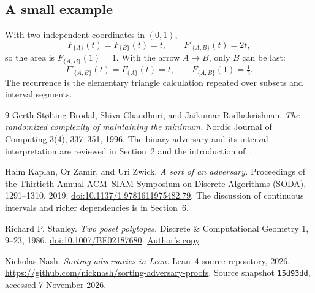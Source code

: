 \subsection{A small example}

With two independent coordinates in \((0,1)\),
\[
F_{\{A\}}(t)=F_{\{B\}}(t)=t,\qquad
F'_{\{A,B\}}(t)=2t,
\]
so the area is \(F_{\{A,B\}}(1)=1\). With the arrow \(A\to B\), only \(B\) can be last:
\[
F'_{\{A,B\}}(t)=F_{\{A\}}(t)=t,
\qquad F_{\{A,B\}}(1)=\tfrac12.
\]
The recurrence is the elementary triangle calculation repeated over subsets and interval segments.

\begin{thebibliography}{9}
Gerth St{\o}lting Brodal, Shiva Chaudhuri, and Jaikumar Radhakrishnan.
\emph{The randomized complexity of maintaining the minimum.}
Nordic Journal of Computing 3(4), 337--351, 1996.
The binary adversary and its interval interpretation are reviewed in Section~2 and the introduction of~\cite{kzz}.

Haim Kaplan, Or Zamir, and Uri Zwick.
\emph{A sort of an adversary.}
Proceedings of the Thirtieth Annual ACM--SIAM Symposium on Discrete Algorithms (SODA), 1291--1310, 2019.
\href{https://doi.org/10.1137/1.9781611975482.79}{doi:10.1137/1.9781611975482.79}.
The discussion of continuous intervals and richer dependencies is in Section~6.

Richard P. Stanley.
\emph{Two poset polytopes.}
Discrete \& Computational Geometry 1, 9--23, 1986.
\href{https://doi.org/10.1007/BF02187680}{doi:10.1007/BF02187680}.
\href{https://math.mit.edu/~rstan/pubs/pubfiles/66.pdf}{Author's copy}.

Nicholas Nash.
\emph{Sorting adversaries in Lean.}
Lean~4 source repository, 2026.
\url{https://github.com/nicknash/sorting-adversary-proofs}.
Source snapshot \texttt{15d93dd}, accessed 7 November 2026.

\end{thebibliography}

